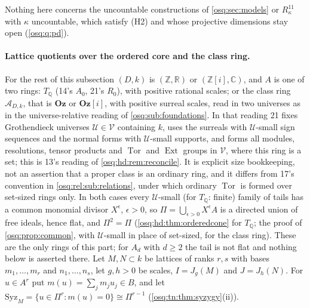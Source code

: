 \documentclass[11pt,letterpaper]{article}
\numberwithin{equation}{section}
\theoremstyle{definition}
\theoremstyle{remark}
\theoremstyle{plain}
\newcommand{\Oz}{\mathbf{Oz}}
\newcommand{\GOz}{\Oz[i]}
\newcommand{\Z}{\mathbb Z}
\newcommand{\Q}{\mathbb Q}
\newcommand{\R}{\mathbb R}
\newcommand{\C}{\mathbb C}
\newcommand{\A}{\mathcal A}          %
\newcommand{\Tor}{\operatorname{Tor}}
\newcommand{\Ext}{\operatorname{Ext}}
\begin{document}
Nothing here concerns the uncountable constructions of \cref{osq:sec:models} or $R^{11}_\kappa$ with $\kappa$ uncountable, which satisfy (H2)
and whose projective dimensions stay open (\cref{osq:q:pd}).

\paragraph{Lattice quotients over the ordered core and the class ring.} For the rest of this subsection $(D,k)$ is $(\Z,\R)$ or
$(\Z[i],\C)$, and $A$ is one of two rings: $T_\Q$ (14's $A_0$, 21's $R_0$), with positive rational scales; or the class ring $\A_{D,k}$, that
is $\Oz$ or $\GOz$, with positive surreal scales, read in two universes as in the universe-relative reading of \cref{osq:sub:foundations}.
In that reading 21 fixes Grothendieck universes $\mathcal U\in\mathcal V$ containing $k$, uses the surreals with $\mathcal U$-small sign
sequences and the normal forms with $\mathcal U$-small supports, and forms all modules, resolutions, tensor products and $\Tor$ and $\Ext$
groups in $\mathcal V$, where this ring is a set; this is 13's reading of \cref{osq:hd:rem:reconcile}. It is explicit size bookkeeping, not
an assertion that a proper class is an ordinary ring, and it differs from 17's convention in \cref{osq:rel:sub:relations}, under which
ordinary $\Tor$ is formed over set-sized rings only. In both cases every $\mathcal U$-small (for $T_\Q$: finite) family of tails has a
common monomial divisor $X^\epsilon$, $\epsilon>0$, so $\Pi=\bigcup_{\epsilon>0}X^\epsilon A$ is a directed union of free ideals, hence flat,
and $\Pi^2=\Pi$ (\cref{osq:hd:thm:orderedcone} for $T_\Q$; the proof of \cref{osq:prop:common}, with $\mathcal U$-small in place of set-sized,
for the class ring). These are the only rings of this part; for $A_d$ with $d\ge2$ the tail is not flat and nothing below is asserted there.
Let $M,N\subset k$ be lattices of ranks $r,s$ with bases $m_1,\dots,m_r$ and $n_1,\dots,n_s$, let $g,h>0$ be scales, $I=J_g(M)$ and
$J=J_h(N)$. For $u\in A^r$ put $m(u)=\sum_jm_ju_j\in B$, and let $\mathrm{Syz}_M=\{u\in\Pi^r:m(u)=0\}\cong\Pi^{r-1}$
(\cref{osq:tn:thm:syzygy}(ii)).
\end{document}
